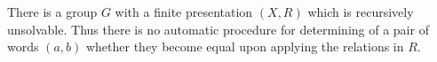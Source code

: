 There is a group $G$ with a finite presentation $(X, R)$ which is recursively unsolvable. Thus there is no automatic procedure for determining of a pair of words $(a, b)$ whether they become equal upon applying the relations in $R$.